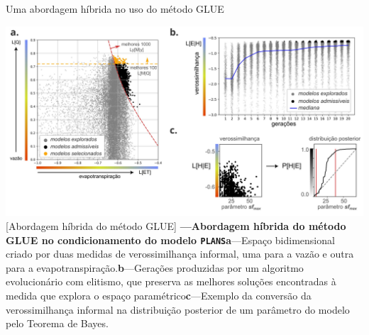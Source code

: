 \documentclass[./main.tex]{subfiles}
\begin{document}
\begin{simplebox}[
    float=ht!,
    label={destaque_abordagem_hibrida},
    nameref={Exploração híbrida}
    ]{Uma abordagem híbrida no uso do método GLUE}
    \begin{minipage}[t]{\linewidth}
        \begin{minipage}[t]{\linewidth}
        \vspace*{5pt}
        	\includegraphics[width=\linewidth]{figs/fig_glue.jpg}	
        	[Abordagem híbrida do método GLUE]{
                \textbf{---\;Abordagem híbrida do método GLUE no condicionamento do modelo \texttt{PLANS}}\;\textbf{a}\;---\;Espaço bidimensional criado por duas medidas de verossimilhança informal, uma para a vazão e outra para a evapotranspiração.\;\textbf{b}\;---\;Gerações produzidas por um algoritmo evolucionário com elitismo, que preserva as melhores soluções encontradas à medida que explora o espaço paramétrico\;\textbf{c}\;---\;Exemplo da conversão da verossimilhança informal na distribuição posterior de um parâmetro do modelo pelo Teorema de Bayes. 
        	}
            \label{fig:glue}  %
        \vspace*{5pt}
        \end{minipage}
    \end{minipage}
    

\end{simplebox}
\end{document}
